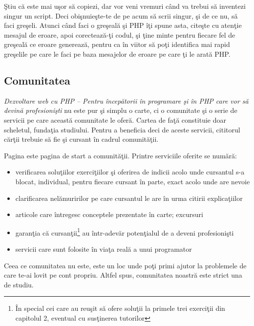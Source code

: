 Ştiu că este mai uşor să copiezi, dar vor veni vremuri când va
trebui să inventezi singur un script. Deci obişnuieşte-te de
pe acum să scrii singur, şi de ce nu, să faci greşeli. Atunci
când faci o greşeală şi PHP îţi spune asta, citeşte cu atenţie
mesajul de eroare, apoi corectează-ţi codul, şi ţine minte
pentru fiecare fel de greşeală ce eroare generează, pentru ca
în viitor să poţi identifica mai rapid greşelile pe care le faci
pe baza mesajelor de eroare pe care ţi le arată PHP.


{}
\subsection*{Comunitatea}
\textit{Dezvoltare web cu PHP -- Pentru începătorii în programare şi în PHP care vor să devină profesionişti}
nu este pur şi simplu o carte, ci o comunitate şi o serie de servicii pe care
această comunitate le oferă. Cartea de faţă constituie doar scheletul, fundaţia
studiului. Pentru a beneficia deci de aceste servicii, cititorul cărţii
trebuie să fie şi cursant în cadrul comunităţii.

Pagina {\phpro} este pagina de start a comunităţii. Printre serviciile oferite se numără:
\begin{itemize}
	\item verificarea soluţiilor exerciţiilor şi oferirea de indicii acolo unde cursantul s-a blocat, individual,
pentru fiecare cursant în parte, exact acolo unde are nevoie
	\item clarificarea nelămuririlor pe care cursantul le are în urma citirii explicaţiilor
	\item articole care întregesc conceptele prezentate în carte; excursuri
	\item garanţia că cursanţii\footnote{În special cei care au reuşit
să ofere soluţii la primele trei exerciţii din capitolul 2, eventual cu susţinerea
tutorilor} au într-adevăr potenţialul de a deveni profesionişti
	\item servicii care sunt folosite în viaţa reală a unui programator
\end{itemize}

Ceea ce comunitatea {\phpro} nu este, este un loc unde poţi primi ajutor la
problemele de care te-ai lovit pe cont propriu. Altfel spus, comunitatea
noastră este strict una de studiu.

